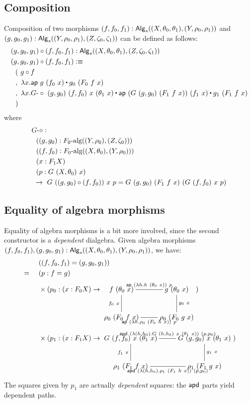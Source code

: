 \documentclass[a4paper,10pt]{report}
\begin{document}
\subsection{Composition}

Composition of two morphisms
$(f,f_0,f_1) : \mathsf{Alg}_s((X,\theta_0,\theta_1),(Y,\rho_0,\rho_1))$ and
$(g,g_0,g_1) : \mathsf{Alg}_s((Y,\rho_0,\rho_1),(Z,\zeta_0,\zeta_1))$ can be
defined as follows:
%
\begin{align*}
&(g,g_0,g_1) \circ (f,f_0,f_1) : \Alg_s((X,\theta_0,\theta_1),(Z,\zeta_0,\zeta_1)) \\
&(g,g_0,g_1) \circ (f,f_0,f_1) \ddefeq \\
&\ \ (\ g \circ f \\
&\ \ ,\ \lambda x . \ap\ g\ (f_0\ x) \ct g_0\ (F_0\ f\ x) \\
&\ \ ,\ \lambda x . \Gcomp\ (g,g_0)\ (f,f_0)\ x\ (\theta_1\ x) \ct \ap\ (G\ (g,g_0)\ (F_1\ f\ x))\ (f_1\ x) \ct g_1\ (F_1\ f\ x) \\
&\ \ )
\end{align*}
%
where
%
\begin{align*}
&\Gcomp : \\ 
&\ \ ((g,g_0) : \algcat{F_0}((Y,\rho_0),(Z,\zeta_0))) \\
&\ \ ((f,f_0) : \algcat{F_0}((X,\theta_0),(Y,\rho_0))) \\
&\ \ (x : F_1 X) \\
&\ \ (p : G\ (X,\theta_0)\ x) \\
&\ \to\ G\ ((g,g_0) \circ (f,f_0))\ x\ p = G\ (g,g_0)\ (F_1\ f\ x)\ (G\ (f,f_0)\ x\ p)
\end{align*}
%

\subsection{Equality of algebra morphisms}
Equality of algebra morphisms is a bit more involved, since the second
constructor is a \emph{dependent} dialgebra. Given algebra morphisms
$(f,f_0,f_1), (g,g_0,g_1) :
\mathsf{Alg}_s((X,\theta_0,\theta_1),(Y,\rho_0,\rho_1))$, we have:
%
\begin{align*}
  & &&\ ((f,f_0,f_1) = (g,g_0,g_1)) \\
  &=&&\ (p : f = g) \\
  & &&\ \times (p_0 : (x : F_0 X) \to 
  \xymatrix{
    f\ (\theta_0\ x) \ar@{-}[d]_{f_0\ x} \ar@{-}[r]^{\ap\ (\lambda h . h\ (\theta_0\ x))\ p}  &g\ (\theta_0\ x) \ar@{-}[d]^{g_0\ x} \\
    \rho_0\ (F_0\ f\ x) \ar@{-}[r]_{\ap\ (\lambda h . \rho_0\ (F_0\ h\ x))\ p} &\rho_0\ (F_0\ g\ x)
  }) \\
  & &&\ \times (p_1 : (x : F_1 X) \to
  \xymatrix{
    G\ (f,f_0)\ x\ (\theta_1\ x) \ar@{-}[d]_{f_1\ x} \ar@{-}[r]^{\apd\ (\lambda (h,h_0) . G\ (h,h_0)\ x\ (\theta_1\ x))\ (p,p_0)}  &G\ (g,g_0)\ x\ (\theta_1\ x) \ar@{-}[d]^{g_1\ x} \\
    \rho_1\ (F_1\ f\ x) \ar@{-}[r]_{\apd\ (\lambda (h,h_0) . \rho_1\ (F_1\ h\ x))\ (p,p_0)} &\rho_1\ (F_1\ g\ x)
  }) \\
\end{align*}
%
The squares given by $p_1$ are actually \emph{dependent} squares: the
$\mathsf{apd}$ parts yield dependent paths. 
\end{document}
